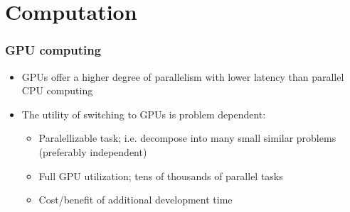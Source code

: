\documentclass{beamer}
\begin{document}



\section{Computation}

\begin{frame}%
  \frametitle{GPU computing}
  \begin{itemize}
    \item GPUs offer a higher degree of parallelism with lower latency than parallel CPU computing
    \item The utility of switching to GPUs is problem dependent:
    \begin{itemize}
      \item Paralellizable task; i.e. decompose into many small similar problems (preferably independent)
      \item Full GPU utilization; tens of thousands of parallel tasks
      \item Cost/benefit of additional development time
    \end{itemize}
  \end{itemize}
\end{frame}
\end{document}
